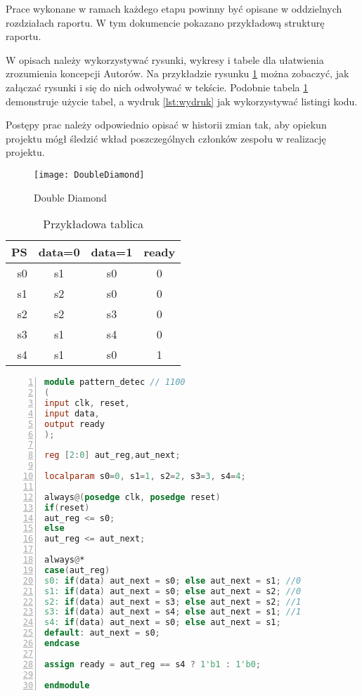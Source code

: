 \documentclass[a4paper,titleauthor]{mwart}
\begin{document}
Prace wykonane w ramach każdego etapu powinny być opisane w oddzielnych rozdziałach raportu. W tym dokumencie pokazano przykładową strukturę raportu. 

W opisach należy wykorzystywać rysunki, wykresy i tabele dla ułatwienia zrozumienia koncepcji Autorów. Na przykładzie rysunku  \ref{fig:double_diamond}  można zobaczyć, jak załączać rysunki i się do nich odwoływać w tekście. Podobnie tabela \ref{tab:tabela_prawdy} demonstruje użycie tabel, a wydruk \ref{lst:wydruk} jak wykorzystywać listingi kodu. 

Postępy prac należy odpowiednio opisać w historii zmian tak, aby opiekun projektu mógł śledzić wkład poszczególnych członków zespołu w realizację projektu.

\begin{figure}[h]
	\centering
	\texttt{[image: DoubleDiamond]}
	\caption{\label{fig:double_diamond}Double Diamond}
\end{figure}

\begin{table}[ht]
	\begin{center}
		\caption{Przykładowa tablica}
		\label{tab:tabela_prawdy}
		\begin{tabular}{|r||c|c||c|}
			\hline 
			PS & data=0 & data=1 & ready \\
			\hline \hline
			s0 & s1 & s0 & 0 \\
			s1 & s2 & s0 & 0 \\
			s2 & s2 & s3 & 0\\
			s3 & s1 & s4 & 0 \\ 
			s4 & s1 & s0 & 1 \\ 
			\hline
		\end{tabular}
	\end{center}
\end{table}

\begin{lstlisting}[label=lst:wydruk,caption={Przykładowy wydruk},language=Verilog,numbers=left]
module pattern_detec // 1100 
(	
input clk, reset,
input data,
output ready
);

reg [2:0] aut_reg,aut_next;

localparam s0=0, s1=1, s2=2, s3=3, s4=4;

always@(posedge clk, posedge reset)
if(reset)
aut_reg <= s0;
else
aut_reg <= aut_next;

always@*
case(aut_reg)
s0: if(data) aut_next = s0; else aut_next = s1; //0
s1: if(data) aut_next = s0; else aut_next = s2; //0
s2: if(data) aut_next = s3; else aut_next = s2; //1
s3: if(data) aut_next = s4; else aut_next = s1; //1
s4: if(data) aut_next = s0; else aut_next = s1;
default: aut_next = s0; 
endcase

assign ready = aut_reg == s4 ? 1'b1 : 1'b0;	

endmodule
\end{lstlisting}
\end{document}
